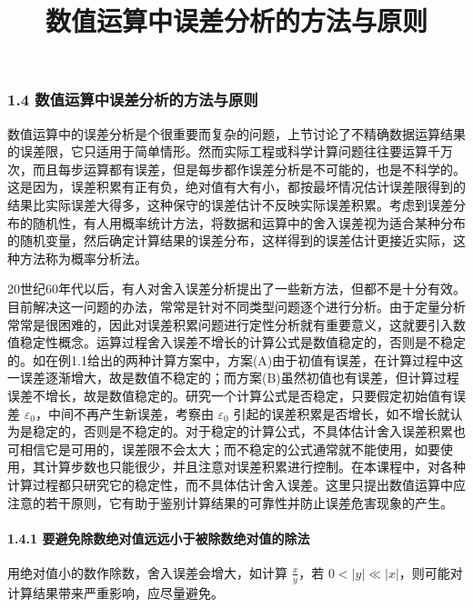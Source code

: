 \documentclass[
  10pt,
  fontset=fandol]{ctexart}
\title{数值运算中误差分析的方法与原则}
\author{}
\date{}
\begin{document}
\maketitle

\subsubsection{1.4 数值运算中误差分析的方法与原则}\label{ux6570ux503cux8fd0ux7b97ux4e2dux8befux5deeux5206ux6790ux7684ux65b9ux6cd5ux4e0eux539fux5219}

数值运算中的误差分析是个很重要而复杂的问题，上节讨论了不精确数据运算结果的误差限，它只适用于简单情形。然而实际工程或科学计算问题往往要运算千万次，而且每步运算都有误差，但是每步都作误差分析是不可能的，也是不科学的。这是因为，误差积累有正有负，绝对值有大有小，都按最坏情况估计误差限得到的结果比实际误差大得多，这种保守的误差估计不反映实际误差积累。考虑到误差分布的随机性，有人用概率统计方法，将数据和运算中的舍入误差视为适合某种分布的随机变量，然后确定计算结果的误差分布，这样得到的误差估计更接近实际，这种方法称为概率分析法。

20世纪60年代以后，有人对舍入误差分析提出了一些新方法，但都不是十分有效。目前解决这一问题的办法，常常是针对不同类型问题逐个进行分析。由于定量分析常常是很困难的，因此对误差积累问题进行定性分析就有重要意义，这就要引入数值稳定性概念。运算过程舍入误差不增长的计算公式是数值稳定的，否则是不稳定的。如在例1.1给出的两种计算方案中，方案(A)由于初值有误差，在计算过程中这一误差逐渐增大，故是数值不稳定的；而方案(B)虽然初值也有误差，但计算过程误差不增长，故是数值稳定的。研究一个计算公式是否稳定，只要假定初始值有误差 \(\varepsilon_0\)，中间不再产生新误差，考察由 \(\varepsilon_0\) 引起的误差积累是否增长，如不增长就认为是稳定的，否则是不稳定的。对于稳定的计算公式，不具体估计舍入误差积累也可相信它是可用的，误差限不会太大；而不稳定的公式通常就不能使用，如要使用，其计算步数也只能很少，并且注意对误差积累进行控制。在本课程中，对各种计算过程都只研究它的稳定性，而不具体估计舍入误差。这里只提出数值运算中应注意的若干原则，它有助于鉴别计算结果的可靠性并防止误差危害现象的产生。

\paragraph{1.4.1 要避免除数绝对值远远小于被除数绝对值的除法}\label{ux8981ux907fux514dux9664ux6570ux7eddux5bf9ux503cux8fdcux8fdcux5c0fux4e8eux88abux9664ux6570ux7eddux5bf9ux503cux7684ux9664ux6cd5}

用绝对值小的数作除数，舍入误差会增大，如计算 \(\frac{x}{y}\)，若 \(0 < |y| \ll |x|\)，则可能对计算结果带来严重影响，应尽量避免。
\end{document}
